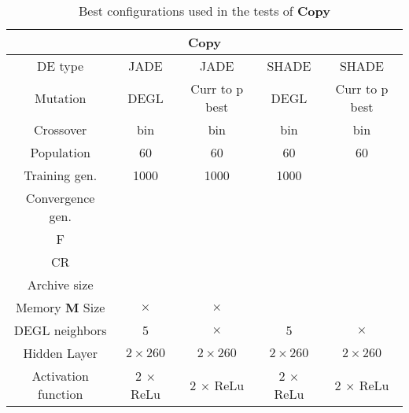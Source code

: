 \begin{table}[]
	\centering
	\begin{tabular}{|c|c|c|c|c|}
		\hline
		\multicolumn{5}{|c|}{\textbf{Copy}} \\ \hline
		DE type & JADE & JADE & SHADE & SHADE \\ \hline
		Mutation & DEGL & Curr to p best & DEGL & Curr to p best  \\ \hline
		Crossover & bin & bin & bin & bin \\ \hline
		Population & 60 & 60 & 60 & 60 \\ \hline
		Training gen. & 1000 & 1000 & 1000 & \\ \hline
		Convergence gen. & & & & \\ \hline
		F & & & & \\ \hline
		CR & & & & \\ \hline
		Archive size & & & & \\ \hline
		Memory \textbf{M} Size & $\times$ & $\times$ & & \\ \hline
		DEGL neighbors & 5 & $\times$ & 5 & $\times$ \\ \hline
		Hidden Layer & $2 \times 260$ & $2 \times 260$ & $2 \times 260$ &  $2 \times 260$\\ \hline
		Activation function & 2 $\times$ ReLu & 2 $\times$ ReLu & 2 $\times$ ReLu & 2 $\times$ ReLu \\ \hline
	\end{tabular}
	\caption{Best configurations used in the tests of \textbf{Copy}}
	\label{tbl:tests-configurations-copy}
\end{table}


